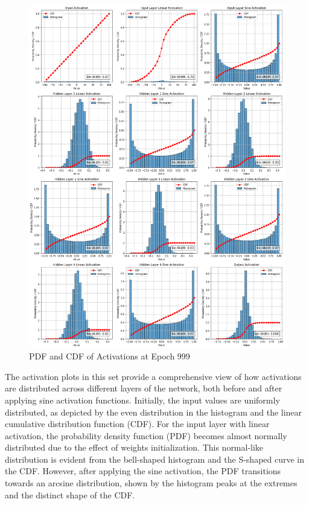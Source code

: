 \documentclass{ioereport}
\begin{document}
        \begin{figure}[H]
        \centering
        \includegraphics[width=\linewidth]{assets/audio histogram/epoch999activations.png}
        \caption{PDF and CDF of Activations at Epoch 999}
        \label{fig:audio-activation-999}
    \end{figure}

    The activation plots in this set provide a comprehensive view of how activations are distributed across different layers of the network, both before and after applying sine activation functions. Initially, the input values are uniformly distributed, as depicted by the even distribution in the histogram and the linear cumulative distribution function (CDF). For the input layer with linear activation, the probability density function (PDF) becomes almost normally distributed due to the effect of weights initialization. This normal-like distribution is evident from the bell-shaped histogram and the S-shaped curve in the CDF. However, after applying the sine activation, the PDF transitions towards an arcsine distribution, shown by the histogram peaks at the extremes and the distinct shape of the CDF.
\end{document}
